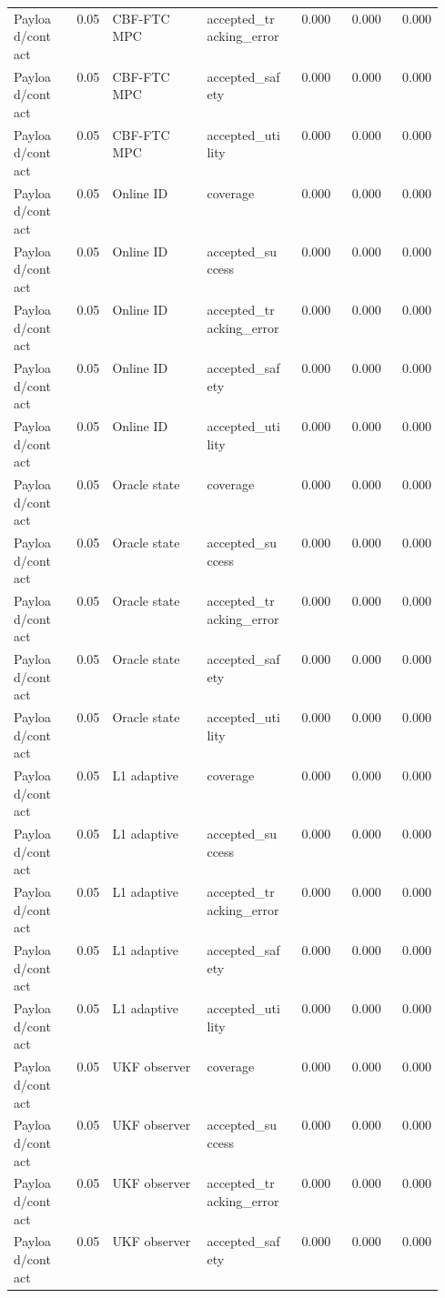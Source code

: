 \documentclass{article}
\begin{document}
\begin{center}
\begin{longtable}{p{0.13\linewidth}rp{0.22\linewidth}p{0.20\linewidth}rrr}
Payload/contact & 0.05 & CBF-FTC MPC & accepted\_tracking\_error & 0.000 & 0.000 & 0.000\\
Payload/contact & 0.05 & CBF-FTC MPC & accepted\_safety & 0.000 & 0.000 & 0.000\\
Payload/contact & 0.05 & CBF-FTC MPC & accepted\_utility & 0.000 & 0.000 & 0.000\\
Payload/contact & 0.05 & Online ID & coverage & 0.000 & 0.000 & 0.000\\
Payload/contact & 0.05 & Online ID & accepted\_success & 0.000 & 0.000 & 0.000\\
Payload/contact & 0.05 & Online ID & accepted\_tracking\_error & 0.000 & 0.000 & 0.000\\
Payload/contact & 0.05 & Online ID & accepted\_safety & 0.000 & 0.000 & 0.000\\
Payload/contact & 0.05 & Online ID & accepted\_utility & 0.000 & 0.000 & 0.000\\
Payload/contact & 0.05 & Oracle state & coverage & 0.000 & 0.000 & 0.000\\
Payload/contact & 0.05 & Oracle state & accepted\_success & 0.000 & 0.000 & 0.000\\
Payload/contact & 0.05 & Oracle state & accepted\_tracking\_error & 0.000 & 0.000 & 0.000\\
Payload/contact & 0.05 & Oracle state & accepted\_safety & 0.000 & 0.000 & 0.000\\
Payload/contact & 0.05 & Oracle state & accepted\_utility & 0.000 & 0.000 & 0.000\\
Payload/contact & 0.05 & L1 adaptive & coverage & 0.000 & 0.000 & 0.000\\
Payload/contact & 0.05 & L1 adaptive & accepted\_success & 0.000 & 0.000 & 0.000\\
Payload/contact & 0.05 & L1 adaptive & accepted\_tracking\_error & 0.000 & 0.000 & 0.000\\
Payload/contact & 0.05 & L1 adaptive & accepted\_safety & 0.000 & 0.000 & 0.000\\
Payload/contact & 0.05 & L1 adaptive & accepted\_utility & 0.000 & 0.000 & 0.000\\
Payload/contact & 0.05 & UKF observer & coverage & 0.000 & 0.000 & 0.000\\
Payload/contact & 0.05 & UKF observer & accepted\_success & 0.000 & 0.000 & 0.000\\
Payload/contact & 0.05 & UKF observer & accepted\_tracking\_error & 0.000 & 0.000 & 0.000\\
Payload/contact & 0.05 & UKF observer & accepted\_safety & 0.000 & 0.000 & 0.000\\

\end{longtable}
\end{center}
\end{document}
